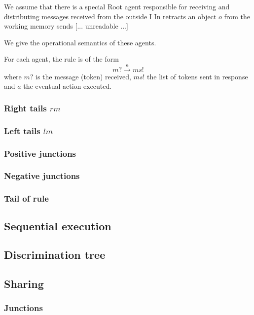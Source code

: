 We assume that there is a special Root agent responsible for receiving and distributing
messages received from the outside I In retracts an object $o$ from the working memory sends
[... unreadable ...]

We give the operational semantics of these agents.

For each agent, the rule is of the form
\begin{equation}
m? \stackrel{a}{\rightarrow} ms!
\end{equation}
where $m?$ is the message (token) received, $ms!$ the list of tokens sent in response and
$a$ the eventual action executed.

\subsubsection{Right tails $rm$}

\subsubsection{Left tails $lm$}

\subsubsection{Positive junctions}

\subsubsection{Negative junctions}

\subsubsection{Tail of rule}

\subsection{Sequential execution}

\subsection{Discrimination tree}

\subsection{Sharing}

\subsubsection{Junctions}

